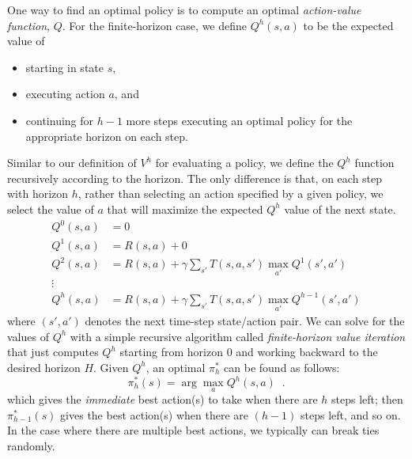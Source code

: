One way to find an optimal policy is to compute an optimal {\em action-value function}, $Q$.  For the finite-horizon case, we define
$Q^h(s, a)$ to be the expected value of
\begin{itemize}
  \item starting in state $s$,
  \item executing action $a$, and
  \item continuing for $h - 1$ more steps executing an optimal policy
        for the appropriate horizon on each step.
\end{itemize}
Similar to our definition of $V^h$ for evaluating a policy, we define
the $Q^h$ function recursively according to the horizon.  The only
difference is that, on each step with horizon $h$, rather than
selecting an action specified by a given  policy, we select the value
of $a$ that will maximize the expected $Q^h$ value of the next state.
\begin{align}
  Q^0(s, a) & = 0                                                                 \\
  Q^1(s, a) & = R(s, a) + 0                                                       \\
  Q^2(s, a) & = R(s, a) + \gamma \sum_{s'}T(s, a, s') \max_{a'} Q^1(s', a')       \\
  \vdots
  \nonumber                                                                       \\
  Q^h(s, a) & = R(s, a) + \gamma \sum_{s'}T(s, a, s') \max_{a'} Q^{h - 1}(s', a')
\end{align}
where $(s',a')$ denotes the next time-step state/action pair. We can solve for the values of $Q^h$ with a simple recursive algorithm
called {\it{finite-horizon value iteration}} that just computes $Q^h$ starting
from horizon 0 and working backward to the desired horizon
$H$. Given $Q^h$, an optimal $\pi_h^*$ can be found as follows:
\begin{equation}
  \pi_h^*(s) = \arg\max_{a}Q^h(s, a) \;\;.
\end{equation}
which gives the \emph{immediate} best action(s) to take when there are $h$ steps left; then $\pi_{h-1}^*(s)$ gives the best action(s) when there are $(h-1)$ steps left, and so on. In the case where there are multiple best actions, we typically can break ties randomly.


